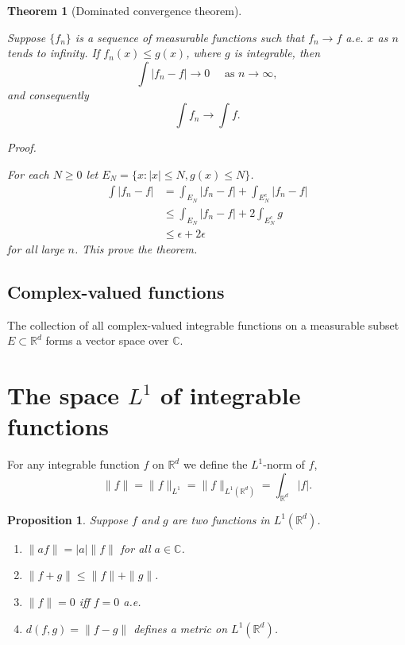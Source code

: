 \documentclass[
]{book}
\providecommand{\tightlist}{%
  \setlength{\itemsep}{0pt}\setlength{\parskip}{0pt}}
\newtheorem{theorem}{Theorem}[chapter]
\newtheorem{proposition}{Proposition}[chapter]
\theoremstyle{definition}
\theoremstyle{definition}
\theoremstyle{definition}
\theoremstyle{definition}
\theoremstyle{remark}
\begin{document}
\begin{theorem}[Dominated convergence theorem]
\protect\hypertarget{thm:dc}{}\label{thm:dc}\leavevmode

Suppose \(\{f_n\}\) is a sequence of measurable functions such that \(f_n\to f\) a.e. \(x\) as \(n\) tends to infinity. If \(f_n(x)\le g(x)\), where \(g\) is integrable, then
\[
\int |f_n-f|\to 0 \quad \text{ as }n\to \infty,
\]
and consequently
\[
\int f_n \to \int f.
\]

\emph{Proof.}

For each \(N\ge 0\) let \(E_N=\{x:|x|\le N, g(x)\le N\}\).
\[
\begin{aligned}
\int|f_n-f|&=\int_{E_N}|f_n-f|+\int_{E_N^c}|f_n-f|\\
&\le \int_{E_N}|f_n-f|+2\int_{E_N^c}g\\
&\le \epsilon +2\epsilon
\end{aligned}
\]
for all large \(n\). This prove the theorem.

\end{theorem}

\subsection{Complex-valued functions}\label{complex-valued-functions}

The collection of all complex-valued integrable functions on a measurable subset \(E\subset \mathbb{R}^d\) forms a vector space over \(\mathbb{C}\).

\section{\texorpdfstring{The space \(L^1\) of integrable functions}{The space L\^{}1 of integrable functions}}\label{the-space-l1-of-integrable-functions}

For any integrable function \(f\) on \(\mathbb{R}^d\) we define the \(L^1\)-norm of \(f\),
\[
\|f\|=\|f\|_{L^1}=\|f\|_{L^1(\mathbb{R}^d)}=\int_{\mathbb{R}^d}|f|.
\]

\begin{proposition}

Suppose \(f\) and \(g\) are two functions in \(L^1(\mathbb{R}^d)\).

\begin{enumerate}
\def\labelenumi{\arabic{enumi}.}
\tightlist
\item
  \(\|af\|=|a|\|f\|\) for all \(a\in\mathbb{C}\).
\item
  \(\|f+g\|\le \|f\|+\|g\|\).
\item
  \(\|f\|=0\) iff \(f=0\) a.e.
\item
  \(d(f,g)=\|f-g\|\) defines a metric on \(L^1(\mathbb{R}^d)\).
\end{enumerate}

\end{proposition}
\end{document}
